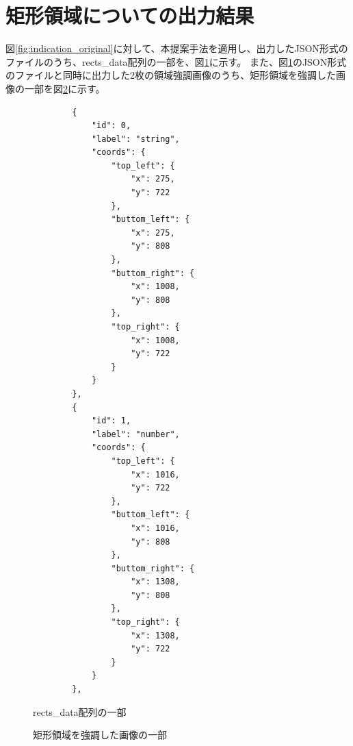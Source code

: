 \section{矩形領域についての出力結果}\label{sec:result_rect}
図\ref{fig:indication_original}に対して、本提案手法を適用し、出力したJSON形式のファイルのうち、rects\_data配列の一部を、図\ref{fig:rects_data_json}に示す。
また、図\ref{fig:rects_data_json}のJSON形式のファイルと同時に出力した2枚の領域強調画像のうち、矩形領域を強調した画像の一部を図\ref{fig:highlighted_rects_part}に示す。

\lstset{language=}
\begin{figure}[t]
    \begin{lstlisting}
        {
            "id": 0,
            "label": "string",
            "coords": {
                "top_left": {
                    "x": 275,
                    "y": 722
                },
                "buttom_left": {
                    "x": 275,
                    "y": 808
                },
                "buttom_right": {
                    "x": 1008,
                    "y": 808
                },
                "top_right": {
                    "x": 1008,
                    "y": 722
                }
            }
        },
        {
            "id": 1,
            "label": "number",
            "coords": {
                "top_left": {
                    "x": 1016,
                    "y": 722
                },
                "buttom_left": {
                    "x": 1016,
                    "y": 808
                },
                "buttom_right": {
                    "x": 1308,
                    "y": 808
                },
                "top_right": {
                    "x": 1308,
                    "y": 722
                }
            }
        },
    \end{lstlisting}
    \caption{rects\_data配列の一部}\label{fig:rects_data_json}
\end{figure}

\begin{figure}[t]
    \begin{center}
        \caption{矩形領域を強調した画像の一部}
        \label{fig:highlighted_rects_part}
    \end{center}
\end{figure}

